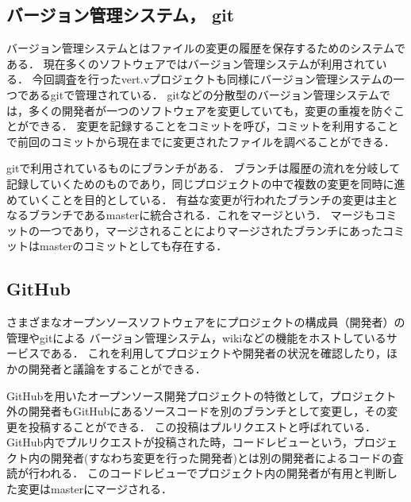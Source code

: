 \documentclass{fose2016}           %
\begin{document}
\subsection{バージョン管理システム， git}
バージョン管理システムとはファイルの変更の履歴を保存するためのシステムである．
現在多くのソフトウェアではバージョン管理システムが利用されている．
今回調査を行ったvert.vプロジェクトも同様にバージョン管理システムの一つであるgitで管理されている．
gitなどの分散型のバージョン管理システムでは，多くの開発者が一つのソフトウェアを変更していても，変更の重複を防ぐことができる．
変更を記録することをコミットを呼び，コミットを利用することで前回のコミットから現在までに変更されたファイルを調べることができる．

gitで利用されているものにブランチがある．
ブランチは履歴の流れを分岐して記録していくためのものであり，同じプロジェクトの中で複数の変更を同時に進めていくことを目的としている．
有益な変更が行われたブランチの変更は主となるブランチであるmasterに統合される．これをマージという．
マージもコミットの一つであり，マージされることによりマージされたブランチにあったコミットはmasterのコミットとしても存在する．

\subsection{GitHub}
さまざまなオープンソースソフトウェアをにプロジェクトの構成員（開発者）の管理やgitによる バージョン管理システム，wikiなどの機能をホストしているサービスである．
これを利用してプロジェクトや開発者の状況を確認したり，ほかの開発者と議論をすることができる．

GitHubを用いたオープンソース開発プロジェクトの特徴として，プロジェクト外の開発者もGitHubにあるソースコードを別のブランチとして変更し，その変更を投稿することができる．
この投稿はプルリクエストと呼ばれている．
GitHub内でプルリクエストが投稿された時，コードレビューという，プロジェクト内の開発者(すなわち変更を行った開発者)とは別の開発者によるコードの査読が行われる．
このコードレビューでプロジェクト内の開発者が有用と判断した変更はmasterにマージされる．


\end{document}
